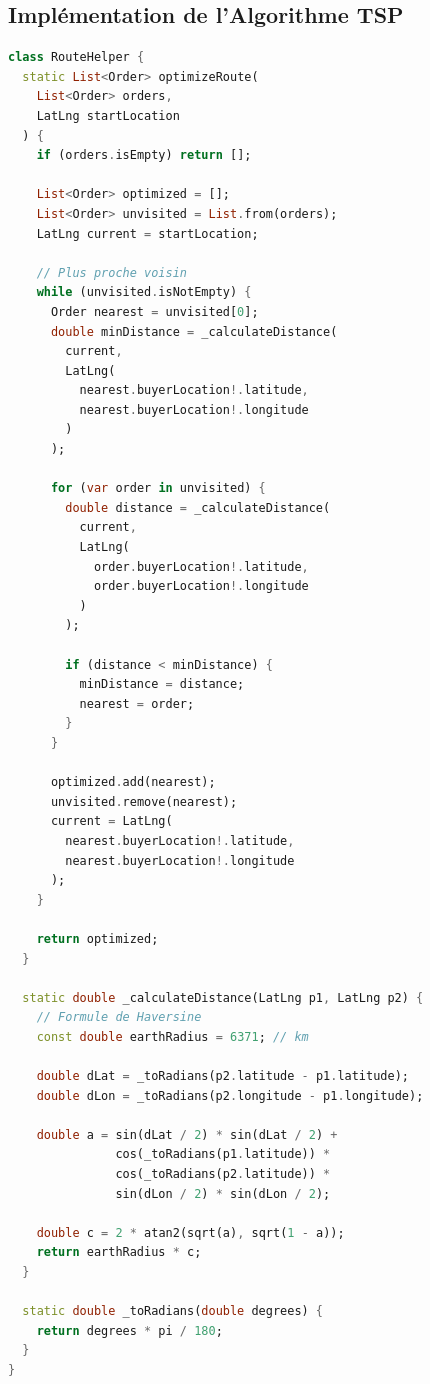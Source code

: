 \documentclass[12pt,a4paper]{report}
\begin{document}
\subsection{Implémentation de l'Algorithme TSP}

\begin{lstlisting}[language=Dart, caption=Algorithme du plus proche voisin]
class RouteHelper {
  static List<Order> optimizeRoute(
    List<Order> orders,
    LatLng startLocation
  ) {
    if (orders.isEmpty) return [];

    List<Order> optimized = [];
    List<Order> unvisited = List.from(orders);
    LatLng current = startLocation;

    // Plus proche voisin
    while (unvisited.isNotEmpty) {
      Order nearest = unvisited[0];
      double minDistance = _calculateDistance(
        current,
        LatLng(
          nearest.buyerLocation!.latitude,
          nearest.buyerLocation!.longitude
        )
      );

      for (var order in unvisited) {
        double distance = _calculateDistance(
          current,
          LatLng(
            order.buyerLocation!.latitude,
            order.buyerLocation!.longitude
          )
        );

        if (distance < minDistance) {
          minDistance = distance;
          nearest = order;
        }
      }

      optimized.add(nearest);
      unvisited.remove(nearest);
      current = LatLng(
        nearest.buyerLocation!.latitude,
        nearest.buyerLocation!.longitude
      );
    }

    return optimized;
  }

  static double _calculateDistance(LatLng p1, LatLng p2) {
    // Formule de Haversine
    const double earthRadius = 6371; // km

    double dLat = _toRadians(p2.latitude - p1.latitude);
    double dLon = _toRadians(p2.longitude - p1.longitude);

    double a = sin(dLat / 2) * sin(dLat / 2) +
               cos(_toRadians(p1.latitude)) *
               cos(_toRadians(p2.latitude)) *
               sin(dLon / 2) * sin(dLon / 2);

    double c = 2 * atan2(sqrt(a), sqrt(1 - a));
    return earthRadius * c;
  }

  static double _toRadians(double degrees) {
    return degrees * pi / 180;
  }
}
\end{lstlisting}
\end{document}
